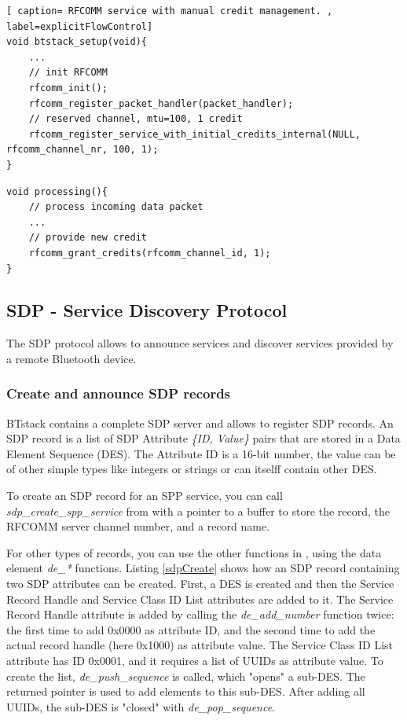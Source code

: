 \begin{lstlisting}[ caption= RFCOMM service with manual credit management. , label=explicitFlowControl]
void btstack_setup(void){
    ...
    // init RFCOMM
    rfcomm_init();
    rfcomm_register_packet_handler(packet_handler);
    // reserved channel, mtu=100, 1 credit
    rfcomm_register_service_with_initial_credits_internal(NULL, rfcomm_channel_nr, 100, 1);  
}
\end{lstlisting}

\begin{lstlisting}[caption= Providing new credits , label=NewCredits]
void processing(){
    // process incoming data packet
    ... 
    // provide new credit
    rfcomm_grant_credits(rfcomm_channel_id, 1);
}
\end{lstlisting}

\subsection{SDP - Service Discovery Protocol}
The SDP protocol allows to announce services and discover services provided by a remote Bluetooth device. 

\subsubsection{Create and announce SDP records}
BTstack contains a complete SDP server and allows to register SDP records. An SDP record is a list of SDP Attribute \emph{\{ID, Value\}} pairs that are stored in a Data Element Sequence (DES). The Attribute ID is a 16-bit number, the value can be of other simple types like integers or strings or can itselff contain other DES. 


To create an SDP record for an SPP service, you can call \emph{sdp\_create\_spp\_service} from  with a pointer to a buffer to store the record, the \mbox{RFCOMM} server channel number, and a record name. 

For other types of records, you can use the other functions in , using the data element \emph{de\_*} functions.  Listing \ref{sdpCreate} shows how an SDP record containing two SDP attributes can be created. First, a DES is created and then the Service Record Handle and Service Class ID List attributes are added to it. The Service Record Handle attribute is added by calling the \emph{de\_add\_number} function twice: the first time to add 0x0000 as attribute ID, and the second time to add the actual record handle (here 0x1000) as attribute value. The Service Class ID List attribute has ID 0x0001, and it requires a list of UUIDs as attribute value. To create the list, \emph{de\_push\_sequence} is called, which "opens" a sub-DES. The returned pointer is used to add elements to this sub-DES. After adding all UUIDs, the sub-DES is "closed" with \emph{de\_pop\_sequence}.

